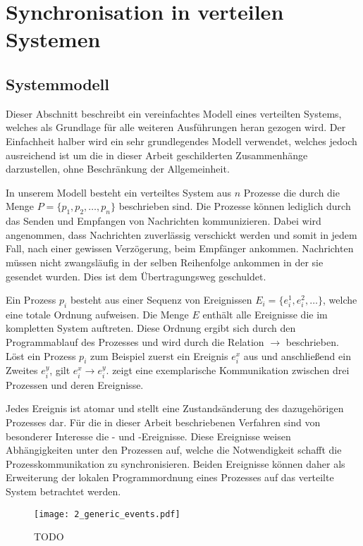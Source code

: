 \section{Synchronisation in verteilen Systemen}
\subsection{Systemmodell}
Dieser Abschnitt beschreibt ein vereinfachtes Modell eines verteilten Systems, welches als Grundlage für alle weiteren Ausführungen heran gezogen wird.
Der Einfachheit halber wird ein sehr grundlegendes Modell verwendet, welches jedoch ausreichend ist um die in dieser Arbeit geschilderten Zusammenhänge darzustellen, ohne Beschränkung der Allgemeinheit.

In unserem Modell besteht ein verteiltes System aus $n$ Prozesse die durch die Menge $P=\{p_1, p_2,\ldots, p_n\}$ beschrieben sind.
Die Prozesse können lediglich durch das Senden und Empfangen von Nachrichten kommunizieren.
Dabei wird angenommen, dass Nachrichten zuverlässig verschickt werden und somit in jedem Fall, nach einer gewissen Verzögerung, beim Empfänger ankommen.
Nachrichten müssen nicht zwangsläufig in der selben Reihenfolge ankommen in der sie gesendet wurden.
Dies ist dem Übertragungsweg geschuldet.

Ein Prozess $p_i$ besteht aus einer Sequenz von Ereignissen $E_i=\{e_i^1, e_i^2, \ldots\}$, welche eine totale Ordnung aufweisen.
Die Menge $E$ enthält alle Ereignisse die im kompletten System auftreten.
Diese Ordnung ergibt sich durch den Programmablauf des Prozesses und wird durch die Relation $\rightarrow$ beschrieben.
Löst ein Prozess $p_i$ zum Beispiel zuerst ein Ereignis $e_i^x$ aus und anschließend ein Zweites $e_i^y$, gilt $e_i^x \rightarrow e_i^y$.  zeigt eine exemplarische Kommunikation zwischen drei Prozessen und deren Ereignisse.

Jedes Ereignis ist atomar und stellt eine Zustandsänderung des dazugehörigen Prozesses dar.
Für die in dieser Arbeit beschriebenen Verfahren sind von besonderer Interesse die - und -Ereignisse.
Diese Ereignisse weisen Abhängigkeiten unter den Prozessen auf, welche die Notwendigkeit schafft die Prozesskommunikation zu synchronisieren.
Beiden Ereignisse können daher als Erweiterung der lokalen Programmordnung eines Prozesses auf das verteilte System betrachtet werden.

\begin{figure}[ht]
    \centering
    \texttt{[image: 2\_generic\_events.pdf]}
    \caption[Beispiel einer beliebigen Kommunikation]{TODO}
    \label{fig:genericEvents}
\end{figure}

